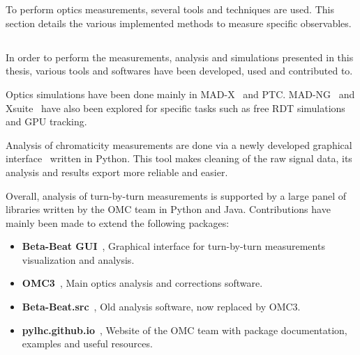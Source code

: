 \section{}

To perform optics measurements, several tools and techniques are used. This section details the
various implemented methods to measure specific observables.

\subsection{}

In order to perform the measurements, analysis and simulations presented in this thesis, various
tools and softwares have been developed, used and contributed to.

Optics simulations have been done mainly in MAD-X~\cite{deniau_mad-x_nodate} and PTC.
MAD-NG~\cite{deniau_mad-ng_2020} and
Xsuite~\cite{g_iadarola_xsuite_nodate} have also been explored for specific tasks such as free RDT
simulations and GPU tracking.

Analysis of chromaticity measurements are done via a newly developed graphical
interface~\cite{m_le_garrec_non-linear_2022} written in Python. This tool makes cleaning of the raw
signal data, its analysis and results export more reliable and easier.

Overall, analysis of turn-by-turn measurements is supported by a large panel of libraries written by
the OMC team in Python and Java. Contributions have mainly been made to extend the following
packages:


\begin{itemize}
    \item \textbf{Beta-Beat GUI}~\cite{omc-team_beta-beat_2008}, Graphical interface for
    turn-by-turn measurements visualization and analysis.
    \item \textbf{OMC3}~\cite{omc-team_omc3_2021}, Main optics analysis and corrections software.
    \item \textbf{Beta-Beat.src}~\cite{omc-team_beta-beatsrc_2018}, Old analysis software, now
    replaced by OMC3.
    \item \textbf{pylhc.github.io}~\cite{omc-team_omc_2020}, Website of the OMC team with package
    documentation, examples and useful resources.
\end{itemize}


